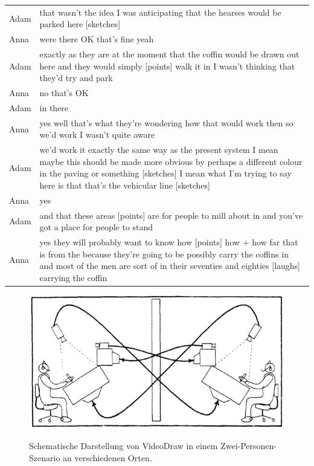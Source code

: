 \begin{extract}{
		\myfloatalign
		\begin{tabularx}{\textwidth}{p{1cm}X}
    		Adam & that wasn’t the idea I was anticipating that the hearses would be parked here [sketches] \\
			Anna & were there OK that’s fine yeah \\
			Adam & exactly as they are at the moment that the coffin would be drawn out	here and they would simply [points] walk it in I wasn’t thinking that they’d try and park \\
			Anna & no that’s OK \\
			Adam & in there \\
			Anna & yes well that’s what they’re wondering how that would work then so we’d work I wasn’t quite aware \\
			Adam & we’d work it exactly the same way as the present system I mean maybe this should be made more obvious by perhaps a different colour in the paving or something [sketches] I mean what I’m trying to say here is that that’s the vehicular line [sketches] \\
			Anna & yes \\
			Adam & and that these areas [points] are for people to mill about in and you’ve got a place for people to stand \\
			Anna & yes they will probably want to know how [points] how + how far that is from the because they’re going to be possibly carry the coffins in and most of the men are sort of in their seventies and eighties [laughs] carrying the coffin \\
		\end{tabularx}
	}
	\label{ext:dantecGestures}
\end{extract}

\begin{figure}[bth]
	{\includegraphics[width=\linewidth]{gfx/tangVideoDraw}}
	\caption[VideoDraw]{Schematische Darstellung von VideoDraw in einem Zwei-Personen-Szenario an verschiedenen Orten.}
	\label{fig:tangVideoDraw}
\end{figure}

